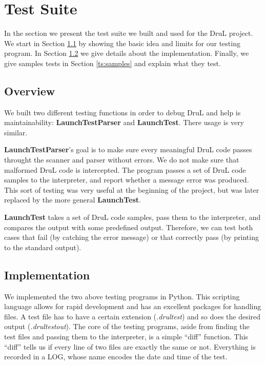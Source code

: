 

\chapter{Test Suite}
In the section we present the test suite we built and used for the DruL 
project. We start in Section \ref{ts:overview} by showing the basic idea
and limits for our testing program. In Section \ref{ts:implem} we give details
about the implementation. Finally, we give samples tests in 
Section \ref{ts:samples} and explain what they test.



\section{Overview} \label{ts:overview}
We built two different testing functions in order to debug DruL and help is
maintainability: \textbf{LaunchTestParser} and \textbf{LaunchTest}. There
usage is very similar.

\textbf{LaunchTestParser}'s goal is to make sure every meaningful DruL code
passes throught the scanner and parser without errors. We do not make sure
that malformed DruL code is intercepted. The program passes a set of DruL code
samples to the interpreter, and report whether a message error was produced.
This sort of testing was very useful at the beginning of the project, but
was later replaced by the more general \textbf{LaunchTest}.

\textbf{LaunchTest} takes a set of DruL code samples, pass them to the
interpreter, and compares the output with some predefined output. Therefore,
we can test both cases that fail (by catching the error message) or that
correctly pass (by printing to the standard output).


\section{Implementation} \label{ts:implem}
We implemented the two above testing programs in Python. This scripting
language allows for rapid development and has an excellent packages for
handling files. A test file has to have a certain extension (\textit{.drultest})
and so does the desired output (\textit{.drultestout}).
The core of the testing programs, aside from finding the test files and passing
them to the interpreter, is a simple ``diff'' function. This ``diff'' tells
us if every line of two files are exactly the same or not.
Everything is recorded in a LOG, whose name encodes the date and time of the test.


